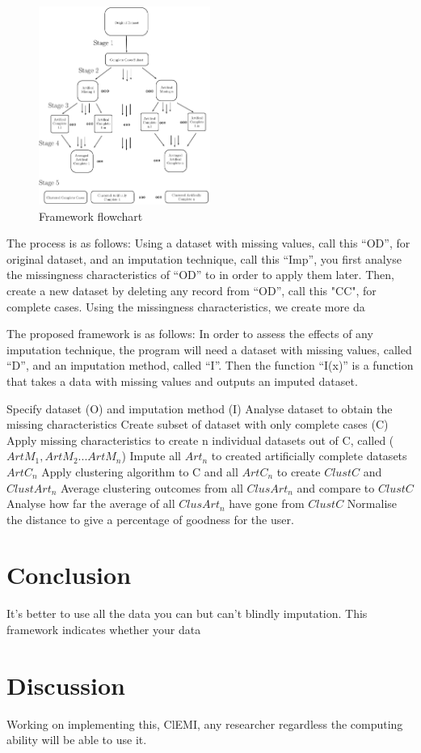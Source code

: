 \documentclass{IEEEconf}
\begin{document}
		\begin{figure}[!ht]
			\caption{Framework flowchart}
			\centering
			\includegraphics[width=0.5\textwidth]{diagram.pdf}
		\end{figure}
		The process is as follows: Using a dataset with missing values, call this ``OD'', for original dataset, and an imputation technique, call this ``Imp'', you first analyse the missingness characteristics of ``OD'' to in order to apply them later. Then, create a new dataset by deleting any record from ``OD'', call this "CC", for complete cases. Using the missingness characteristics, we create more da

		The proposed framework is as follows: In order to assess the effects of any imputation technique, the program will need a dataset with missing values, called ``D'', and an imputation method, called ``I''. Then the function ``I(x)'' is a function that takes a data with missing values and outputs an imputed dataset. 

		Specify dataset (O) and imputation method (I)
		Analyse dataset to obtain the missing characteristics
		Create subset of dataset with only complete cases (C)
		Apply missing characteristics to create n individual datasets out of C, called ($ArtM_{1}, ArtM_{2}...ArtM_{n}$)
		Impute all $Art_{n}$ to created artificially complete datasets $ArtC_{n}$
		Apply clustering algorithm to C and all $ArtC_{n}$ to create $ClustC$ and $ClustArt_{n}$
		Average clustering outcomes from all $ClusArt_{n}$ and compare to $ClustC$
		Analyse how far the average of all $ClusArt_{n}$ have gone from $ClustC$
		Normalise the distance to give a percentage of goodness for the user.

	\section{Conclusion} %
	\label{sec:conclusion}
	It's better to use all the data you can but can't blindly imputation. This framework indicates whether your data 

	\section{Discussion} %
	\label{sec:discussion}
	Working on implementing this, ClEMI, any researcher regardless the computing ability will be able to use it. 

	
	
\end{document}
